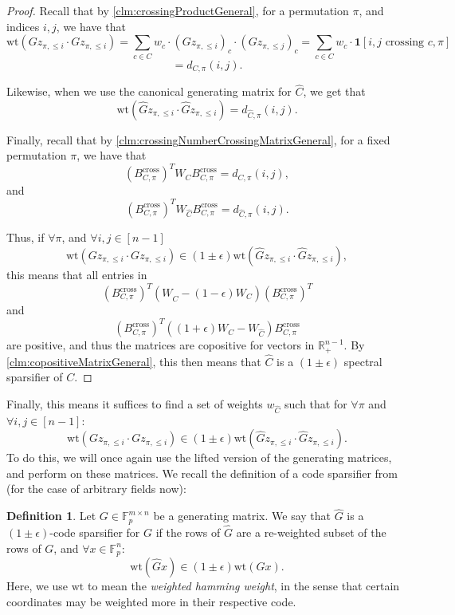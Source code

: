 \documentclass[11pt]{article}
\theoremstyle{definition}
\newtheorem{definition}{Definition}[section]
\newcommand{\F}{\mathbb{F}}
\newcommand{\R}{\mathbb{R}}
\newcommand{\eps}{\epsilon}
\newcommand{\wt}{\mathrm{wt}}
\begin{document}
\begin{proof}
	Recall that by \cref{clm:crossingProductGeneral}, for a permutation $\pi$, and indices $i, j$, we have that 
	\[
	\wt(Gz_{\pi, \leq i} \cdot Gz_{\pi, \leq i}) = \sum_{c \in C} w_c \cdot 
	(G z_{\pi, \leq i})_c \cdot (G z_{\pi, \leq j})_c = \sum_{c \in C} w_c \cdot \mathbf{1}[i,j \text{ crossing } c, \pi] 
	\]
	\[
	= d_{C, \pi}(i,j). 
	\]
	
	Likewise, when we use the canonical generating matrix for $\hat{C}$, we get that 
	\[
	\wt(\hat{G}z_{\pi, \leq i} \cdot \hat{G}z_{\pi, \leq i}) = d_{\hat{C}, \pi}(i,j).
	\]
	
	Finally, recall that by \cref{clm:crossingNumberCrossingMatrixGeneral}, for a fixed permutation $\pi$, we have that 
	\[
	(B^{\text{cross}}_{C, \pi})^T W_C B^{\text{cross}}_{C, \pi} = d_{C, \pi}(i,j),
	\]
	and 
	\[
	(B^{\text{cross}}_{C, \pi})^T W_{\hat{C}} B^{\text{cross}}_{C, \pi} = d_{\hat{C}, \pi}(i,j).
	\]
	
	Thus, if $\forall \pi$, and $\forall i, j \in [n-1]$
	\[
	\wt(Gz_{\pi, \leq i} \cdot Gz_{\pi, \leq  i}) \in (1 \pm \eps) \wt(\hat{G}z_{\pi, \leq  i} \cdot \hat{G}z_{\pi, \leq i}),
	\]
	this means that all entries in 
	\[(B^{\text{cross}}_{C, \pi})^T (W_{\hat{C}} - (1 - \eps)W_C) (B^{\text{cross}}_{C, \pi})^T\]
	and 
	\[
	(B^{\text{cross}}_{C, \pi})^T ((1 + \eps)W_C - W_{\hat{C}} ) B^{\text{cross}}_{C, \pi} 
	\]
	are positive, and thus the matrices are copositive for vectors in $\R^{n-1}_+$. By \cref{clm:copositiveMatrixGeneral}, this then means that $\hat{C}$ is a $(1 \pm \eps)$ spectral sparsifier of $C$.
\end{proof}

Finally, this means it suffices to find a set of weights $w_{\hat{C}}$ such that for $\forall \pi$ and $\forall i, j \in [n-1]$:
\[
\wt(Gz_{\pi, \leq i} \cdot Gz_{\pi, \leq i}) \in (1 \pm \eps) \wt(\hat{G}z_{\pi, \leq i} \cdot \hat{G}z_{\pi, \leq i}).
\]
To do this, we will once again use the lifted version of the generating matrices, and perform  on these matrices. We recall the definition of a code sparsifier from \cite{KPS24} (for the case of arbitrary fields now):

\begin{definition}
	Let $G \in \F_p^{m \times n}$ be a generating matrix. We say that $\hat{G}$ is a $(1 \pm \eps)$-code sparsifier for $G$ if the rows of $\hat{G}$ are a re-weighted subset of the rows of $G$, and $\forall x \in \F_p^n$:
	\[
	\wt(\hat{G}x) \in (1 \pm \eps) \wt(Gx).
	\]
	Here, we use $\wt$ to mean the \emph{weighted hamming weight}, in the sense that certain coordinates may be weighted more in their respective code. 
\end{definition}
\end{document}
